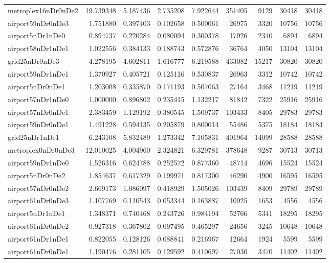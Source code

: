 \begin{longtable}{|l|r|r|r|r|r|r|r|r|}
metroplex16nDr0nDe2 & 19.739348 & 5.187436 & 2.735208 & 7.922644 & 351405 & 9129 & 30418 & 30418 \\
airport59nDr0nDe3 & 1.751880 & 0.397403 & 0.102658 & 0.500061 & 26975 & 3320 & 10756 & 10756 \\
airport5nDr1nDe0 & 0.894737 & 0.220284 & 0.080094 & 0.300378 & 17926 & 2340 & 6894 & 6894 \\
airport58nDr1nDe1 & 1.022556 & 0.384133 & 0.188743 & 0.572876 & 36764 & 4050 & 13104 & 13104 \\
grid25nDr0nDe3 & 4.278195 & 4.602811 & 1.616777 & 6.219588 & 433082 & 15217 & 30820 & 30820 \\
airport59nDr1nDe1 & 1.370927 & 0.405721 & 0.125116 & 0.530837 & 26963 & 3312 & 10742 & 10742 \\
airport5nDr0nDe1 & 1.203008 & 0.335870 & 0.171193 & 0.507063 & 27164 & 3468 & 11219 & 11219 \\
airport57nDr1nDe0 & 1.000000 & 0.896802 & 0.235415 & 1.132217 & 81842 & 7322 & 25916 & 25916 \\
airport57nDr0nDe1 & 2.383459 & 1.129192 & 0.380545 & 1.509737 & 103433 & 8405 & 29783 & 29783 \\
airport59nDr0nDe1 & 1.491228 & 0.594135 & 0.205879 & 0.800014 & 55486 & 5375 & 18184 & 18184 \\
grid25nDr1nDe1 & 6.243108 & 5.832489 & 1.273342 & 7.105831 & 401964 & 14099 & 28588 & 28588 \\
metroplex0nDr0nDe3 & 12.010025 & 4.004960 & 2.324821 & 6.329781 & 378648 & 9287 & 30713 & 30713 \\
airport59nDr1nDe0 & 1.526316 & 0.624788 & 0.252572 & 0.877360 & 48714 & 4696 & 15524 & 15524 \\
airport5nDr0nDe2 & 1.854637 & 0.617329 & 0.199971 & 0.817300 & 46290 & 4900 & 16595 & 16595 \\
airport57nDr0nDe2 & 2.669173 & 1.086097 & 0.418929 & 1.505026 & 103439 & 8409 & 29789 & 29789 \\
airport61nDr0nDe3 & 1.107769 & 0.110543 & 0.053344 & 0.163887 & 10925 & 1653 & 4556 & 4556 \\
airport5nDr1nDe1 & 1.348371 & 0.740468 & 0.243726 & 0.984194 & 52766 & 5341 & 18295 & 18295 \\
airport61nDr0nDe2 & 0.927318 & 0.367802 & 0.097495 & 0.465297 & 24656 & 3245 & 10648 & 10648 \\
airport61nDr1nDe1 & 0.822055 & 0.128126 & 0.088841 & 0.216967 & 12664 & 1924 & 5599 & 5599 \\
airport61nDr0nDe1 & 1.190476 & 0.281105 & 0.129592 & 0.410697 & 27030 & 3470 & 11402 & 11402 \\

\end{longtable}
